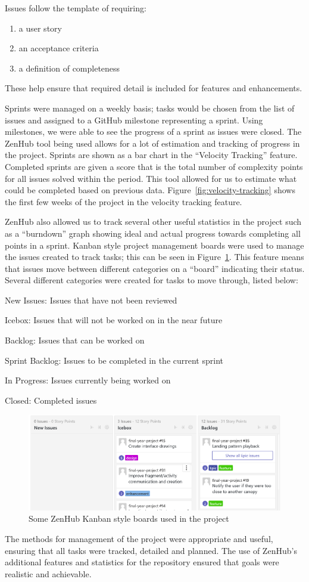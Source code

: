 Issues follow the template of requiring:
\begin{enumerate}[noitemsep]
  \item a user story
  \item an acceptance criteria
  \item a definition of completeness
\end{enumerate}
These help ensure that required detail is included for features and enhancements.

Sprints were managed on a weekly basis; tasks would be chosen from the list of issues and assigned to a GitHub milestone representing a sprint. Using milestones, we were able to see the progress of a sprint as issues were closed.
The ZenHub tool being used allows for a lot of estimation and tracking of progress in the project. Sprints are shown as a bar chart in the ``Velocity Tracking'' feature. Completed sprints are given a score that is the total number of complexity points for all issues solved within the period. This tool allowed for us to estimate what could be completed based on previous data. Figure~\ref{fig:velocity-tracking} shows the first few weeks of the project in the velocity tracking feature.

ZenHub also allowed us to track several other useful statistics in the project such as a ``burndown'' graph showing ideal and actual progress towards completing all points in a sprint.
Kanban style project management boards were used to manage the issues created to track tasks; this can be seen in Figure~\ref{fig:kanban-board}. This feature means that issues move between different categories on a ``board'' indicating their status. Several different categories were created for tasks to move through, listed below:
\newpage
\begin{description}[noitemsep]
  \item New Issues: Issues that have not been reviewed
  \item Icebox: Issues that will not be worked on in the near future
  \item Backlog: Issues that can be worked on
  \item Sprint Backlog: Issues to be completed in the current sprint
  \item In Progress: Issues currently being worked on
  \item Closed: Completed issues
\end{description}

\begin{figure}[ht]
  \centering
  \includegraphics[width=\linewidth]{img/issue-board.png}
  \caption{Some ZenHub Kanban style boards used in the project}\label{fig:kanban-board}
\end{figure}

The methods for management of the project were appropriate and useful, ensuring that all tasks were tracked, detailed and planned. The use of ZenHub's additional features and statistics for the repository ensured that goals were realistic and achievable.
